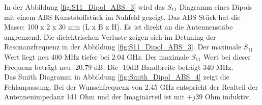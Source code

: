 In der Abbildung \ref{fig:S11_Dipol_ABS_3} wird das $S_{11}$ Diagramm eines Dipols mit einem ABS Kunststoffstück im Nahfeld gezeigt. Das ABS Stück hat die Masse: 100 x 2 x 30 mm (L x B x H). Es ist direkt an die Antennenstäbe angrenzend. Die dielektrischen Verluste zeigen sich im Detuning der Resonanzfrequenz in der Abbildung \ref{fig:S11_Dipol_ABS_3}. Der maximale $S_{11}$ Wert liegt neu 400 MHz tiefer bei 2.04 GHz. Der maximale $S_{11}$ Wert bei dieser Frequenz beträgt  neu -20.79 dB. Die -10dB Bandbreite beträgt 340 MHz.\\



Das Smith Diagramm in Abbildung \ref{fig:Smith_Dipol_ABS_4} zeigt die Fehlanpassung. Bei der Wunschfrequenz von 2.45 GHz entspricht der Realteil der Antennenimpedanz 141 Ohm und der Imaginärteil ist mit $+j39$ Ohm induktiv.
